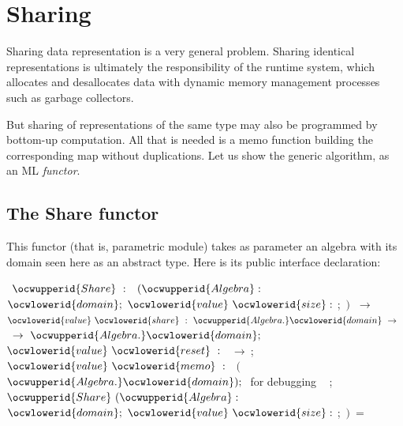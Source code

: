 \documentclass[12pt]{article}
\begin{document}
\section{Sharing}
\label{sharing}

Sharing data representation is a very general problem. 
Sharing identical representations is ultimately the responsibility of
the runtime system, which allocates and desallocates data with dynamic memory
management processes such as garbage collectors. 

But sharing of representations of the same type may also be programmed by 
bottom-up computation. All that is needed is a memo function building the 
corresponding map without duplications.
Let us show the generic algorithm, as an ML {\sl functor}.


\subsection{The Share functor}

This functor (that is, parametric module) takes as parameter an algebra
with its domain seen here as an abstract type. Here is its public interface
declaration:

\label{../ML/share.mli:0}%
\label{../ML/share.mli:618}%
\ocwbegincode{}\ocwindent{0.00em}
~$\ocwupperid{Share}~:~$~$(\ocwupperid{Algebra}:$~~$\ocwlowerid{domain};~\ocwlowerid{value}~\ocwlowerid{size}:~$;~$)~$\ocweol
\ocwindent{0.00em}
$\rightarrow{}~$~$\ocwlowerid{value}~\ocwlowerid{share}~:~\ocwupperid{Algebra.}\ocwlowerid{domain}~\rightarrow{}~$~$\rightarrow{}~\ocwupperid{Algebra.}\ocwlowerid{domain};~$\ocweol
\ocwindent{3.50em}
$\ocwlowerid{value}~\ocwlowerid{reset}~:~$~$\rightarrow{}~$;\ocweol
\ocwindent{3.50em}
$\ocwlowerid{value}~\ocwlowerid{memo}~:~$~$($~$\ocwupperid{Algebra.}\ocwlowerid{domain});~$\ocwbc{} for debugging \ocwec{}~\ocweol
\ocwindent{1.50em}
;\ocweol
\ocwendcode{}
\label{../ML/share.ml:0}%
\label{../ML/share.ml:654}%
\ocwbegincode{}\ocwindent{0.00em}
~$\ocwupperid{Share}~(\ocwupperid{Algebra}:~$~~$\ocwlowerid{domain};~\ocwlowerid{value}~\ocwlowerid{size}:~$;~$)~=~$\medskip
\end{document}
